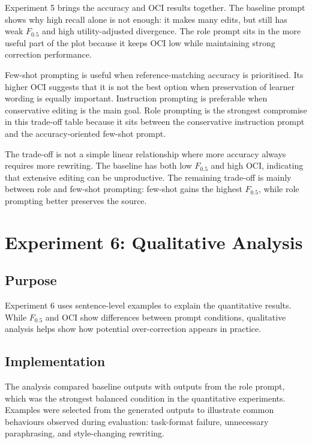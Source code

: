 Experiment 5 brings the accuracy and OCI results together. The baseline prompt shows why high recall alone is not enough: it makes many edits, but still has weak $F_{0.5}$ and high utility-adjusted divergence. The role prompt sits in the more useful part of the plot because it keeps OCI low while maintaining strong correction performance.

Few-shot prompting is useful when reference-matching accuracy is prioritised. Its higher OCI suggests that it is not the best option when preservation of learner wording is equally important. Instruction prompting is preferable when conservative editing is the main goal. Role prompting is the strongest compromise in this trade-off table because it sits between the conservative instruction prompt and the accuracy-oriented few-shot prompt.

The trade-off is not a simple linear relationship where more accuracy always requires more rewriting. The baseline has both low $F_{0.5}$ and high OCI, indicating that extensive editing can be unproductive. The remaining trade-off is mainly between role and few-shot prompting: few-shot gains the highest $F_{0.5}$, while role prompting better preserves the source.

\section{Experiment 6: Qualitative Analysis}

\subsection{Purpose}

Experiment 6 uses sentence-level examples to explain the quantitative results. While $F_{0.5}$ and OCI show differences between prompt conditions, qualitative analysis helps show how potential over-correction appears in practice.

\subsection{Implementation}

The analysis compared baseline outputs with outputs from the role prompt, which was the strongest balanced condition in the quantitative experiments. Examples were selected from the generated outputs to illustrate common behaviours observed during evaluation: task-format failure, unnecessary paraphrasing, and style-changing rewriting.

